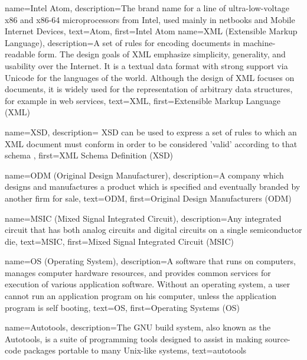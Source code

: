 
{
  name=Intel Atom\textsuperscript{\texttrademark},
  description={The brand name for a line of ultra-low-voltage x86 and
    x86-64 microprocessors from Intel, used mainly in netbooks and
    Mobile Internet Devices},
  text=Atom,
  first=Intel Atom\textsuperscript{\texttrademark}
}
{
  name=XML (Extensible Markup Language),
  description={A set of rules for encoding documents in
    machine-readable form. The design goals of XML emphasize
    simplicity, generality, and usability over the Internet. It is a
    textual data format with strong support via Unicode for the
    languages of the world. Although the design of XML focuses on
    documents, it is widely used for the representation of arbitrary
    data structures, for example in web services},
  text=XML,
  first=Extensible Markup Language (XML)
}

{
  name=XSD,
  description={
    XSD can be used to express a set of rules to which an XML document must
    conform in order to be considered 'valid' according to that schema
  },
  first=XML Schema Definition (XSD)
}

{
  name=ODM (Original Design Manufacturer),
  description={A company which designs and manufactures a product
    which is specified and eventually branded by another firm for
    sale},
  text=ODM,
  first=Original Design Manufacturers (ODM)
}

{
  name=MSIC (Mixed Signal Integrated Circuit),
  description={Any integrated circuit that has both analog circuits
    and digital circuits on a single semiconductor die},
  text=MSIC,
  first=Mixed Signal Integrated Circuit (MSIC)
}

{
  name=OS (Operating System),
  description={A software that runs on computers, manages computer
    hardware resources, and provides common services for execution of
    various application software. Without an operating system, a user
    cannot run an application program on his computer, unless the
    application program is self booting},
  text=OS,
  first=Operating Systems (OS)
}

{
  name=Autotools,
  description={The GNU build system, also known as the Autotools, is a
    suite of programming tools designed to assist in making
    source-code packages portable to many Unix-like systems},
  text=autotools
}

